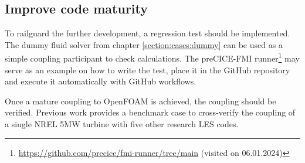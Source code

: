 \begin{comment}
			\item Not sure if you can also set the pressure gradient on the pressure field itself but dont think so
			\item Open: How to do smearing if necessary\\
		\end{itemize}
	\item Additional remark: The OpenFOAM library turbinesFoam\footnote{\url{https://github.com/turbinesFoam/turbinesFoam} (visited 14.12.2023)} \cite{Bachant:2018} might be useful. It implements the actuator line method with different solvers like pimpleFoam in OpenFOAM. The solvers are modified to perform the ALM computation. It is not clear yet how this could be of use, as we want to perform the ALM computation of the turbine to OpenFAST and map the results to OpenFOAM, not do the whole computation in OpenFOAM.
\end{itemize}
\end{comment}

\subsection{Improve code maturity}

To railguard the further development, a regression test should be implemented. The dummy fluid solver from chapter \ref{section:cases:dummy} can be used as a simple coupling participant to check calculations. The preCICE-FMI runner\footnote{\url{https://github.com/precice/fmi-runner/tree/main} (visited on 06.01.2024)} may serve as an example on how to write the test, place it in the GitHub repository and execute it automatically with GitHub workflows.

Once a mature coupling to OpenFOAM is achieved, the coupling should be verified. Previous work \cite{Taschner:2022} provides a benchmark case to cross-verify the coupling of a single NREL 5MW turbine with five other research LES codes.
\begin{comment}
\begin{itemize}
	\item Write a regression test (using the dummy fluid solver)
	\item Create a first test case with documentation
	\item Verify simulation results against simulations done with AspFAST and other tools (\cite{Taschner:2022} gives some benchmark cases)\\
\end{itemize}
\end{comment}

